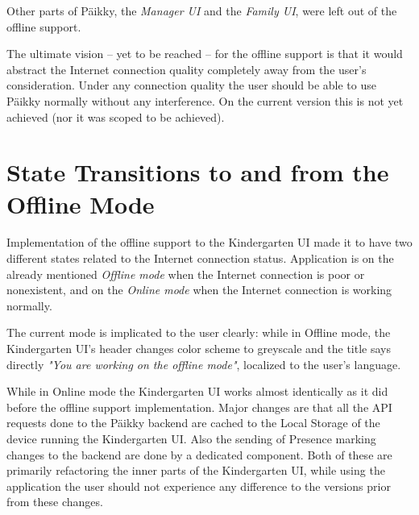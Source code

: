 Other parts of Päikky, the \textit{Manager UI} and the \textit{Family UI}, were left out of the offline support.

The ultimate vision -- yet to be reached -- for the offline support is that it would abstract the Internet connection quality completely away from the user's consideration. Under any connection quality the user should be able to use Päikky normally without any interference. On the current version this is not yet achieved (nor it was scoped to be achieved). %




\section{State Transitions to and from the Offline Mode}

Implementation of the offline support to the Kindergarten UI made it to have two different states related to the Internet connection status. Application is on the already mentioned \textit{Offline mode} when the Internet connection is poor or nonexistent, and on the \textit{Online mode} when the Internet connection is working normally. 

The current mode is implicated to the user clearly: while in Offline mode, the Kindergarten UI's header changes color scheme to greyscale and the title says directly \textit{"You are working on the offline mode"}, localized to the user's language.

While in Online mode the Kindergarten UI works almost identically as it did before the offline support implementation. Major changes are that all the API requests done to the Päikky backend are cached to the Local Storage of the device running the Kindergarten UI. Also the sending of Presence marking changes to the backend are done by a dedicated component. Both of these are primarily refactoring the inner parts of the Kindergarten UI, while using the application the user should not experience any difference to the versions prior from these changes.


